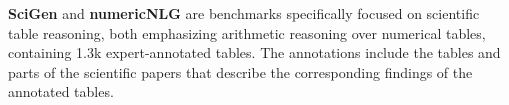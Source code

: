 % 
%
% 
% 
% 
% 
% 
% 
\textbf{SciGen} \citep{BENCHMARKS2021_149e9677} and \textbf{numericNLG} \citep{suadaa-etal-2021-towards} are benchmarks %
specifically focused on scientific table reasoning, both emphasizing arithmetic reasoning over numerical tables, containing %
1.3k expert-annotated tables. %
The annotations include the tables and parts of the scientific papers that describe the corresponding findings of the annotated tables. %

